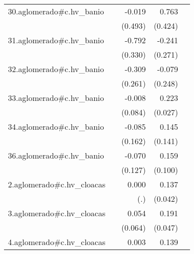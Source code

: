 {\begin{longtable}{l*{4}{D{.}{.}{-1}}}
\addlinespace
30.aglomerado#c.hv\_banio&                     &      -0.019         &       0.763         &                     \\
            &                     &     (0.493)         &     (0.424)         &                     \\
\addlinespace
31.aglomerado#c.hv\_banio&                     &      -0.792\sym{*}  &      -0.241         &                     \\
            &                     &     (0.330)         &     (0.271)         &                     \\
\addlinespace
32.aglomerado#c.hv\_banio&                     &      -0.309         &      -0.079         &                     \\
            &                     &     (0.261)         &     (0.248)         &                     \\
\addlinespace
33.aglomerado#c.hv\_banio&                     &      -0.008         &       0.223\sym{***}&                     \\
            &                     &     (0.084)         &     (0.027)         &                     \\
\addlinespace
34.aglomerado#c.hv\_banio&                     &      -0.085         &       0.145         &                     \\
            &                     &     (0.162)         &     (0.141)         &                     \\
\addlinespace
36.aglomerado#c.hv\_banio&                     &      -0.070         &       0.159         &                     \\
            &                     &     (0.127)         &     (0.100)         &                     \\
\addlinespace
2.aglomerado#c.hv\_cloacas&                     &       0.000         &       0.137\sym{**} &                     \\
            &                     &         (.)         &     (0.042)         &                     \\
\addlinespace
3.aglomerado#c.hv\_cloacas&                     &       0.054         &       0.191\sym{***}&                     \\
            &                     &     (0.064)         &     (0.047)         &                     \\
\addlinespace
4.aglomerado#c.hv\_cloacas&                     &       0.003         &       0.139\sym{***}&                     \\

\end{longtable}}
